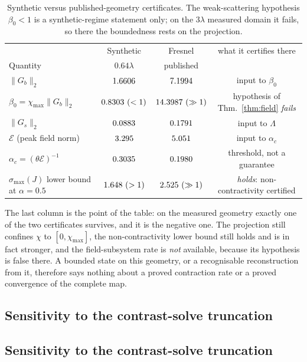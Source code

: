 \documentclass[journal,cmes,article,submit,moreauthors,pdftex]{Definitions/tsp}
\newcommand{\norm}[1]{\lVert #1 \rVert}
\newcommand{\numv}[1]{#1}
\begin{document}
\begin{table}[htbp]
\centering
\caption{Synthetic versus published-geometry certificates. The weak-scattering hypothesis
$\beta_0<1$ is a synthetic-regime statement only; on the $3\lambda$ measured domain it
fails, so there the boundedness rests on the projection.}
\label{tab:fresnel}
\small
\begin{tabular}{@{}lccc@{}}
\toprule
 & Synthetic & Fresnel & what it certifies there \\
Quantity & $0.64\lambda$ & published & \\
\midrule
$\norm{G_b}_2$ & $\numv{\NumGridGbLo}$ & $\numv{\NumFresnelGb}$ & input to $\beta_0$ \\
$\beta_0=\chi_{\max}\norm{G_b}_2$ & $\betacert\ (<1)$ & $\numv{\NumFresnelBeta}\ (\gg1)$ &
hypothesis of Thm.~\ref{thm:field} \emph{fails} \\
$\norm{G_s}_2$ & $\numv{\NumGridGsLo}$ & $\numv{\NumFresnelPubGs}$ & input to $\Lambda$ \\
$\mathcal{E}$ (peak field norm) & $\numv{\NumGridELo}$ & $\numv{\NumFresnelPubEpeak}$ &
input to $\alpha_c$ \\
$\alpha_c=(\theta\mathcal{E})^{-1}$ & $\numv{\NumGridAlphaCLo}$ & $\numv{\NumFresnelPubAlphaC}$ &
threshold, not a guarantee \\
$\sigma_{\max}(J)$ lower bound at $\alpha=0.5$ & $\numv{\NumFresnelSigmaLBSynth}\ (>1)$ & $\numv{\NumFresnelPubSigmaLB}\ (\gg1)$ &
\emph{holds}: non-contractivity certified \\
\bottomrule
\end{tabular}
\end{table}
The last column is the point of the table: on the measured geometry exactly one of the two
certificates survives, and it is the negative one. The projection still confines $\chi$ to
$[0,\chi_{\max}]$, the non-contractivity lower bound still holds and is in fact stronger, and the
field-subsystem rate is \emph{not} available, because its hypothesis is false there. A bounded
state on this geometry, or a recognisable reconstruction from it, therefore says nothing about a
proved contraction rate or a proved convergence of the complete map.

\subsection{Sensitivity to the contrast-solve truncation}
\subsection{Sensitivity to the contrast-solve truncation}
\end{document}
